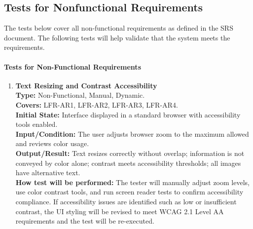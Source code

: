 \documentclass[12pt, titlepage]{article}
\begin{document}
\subsection{Tests for Nonfunctional Requirements}

The tests below cover all non-functional requirements as defined in
the SRS document. The following tests will help validate that the system meets 
the requirements. 

\paragraph{Tests for Non-Functional Requirements}

\begin{enumerate}[label=NFR-ST \arabic*., wide=0pt, leftmargin=*]

  \item{}
    \textbf{Text Resizing and Contrast Accessibility} \\[2mm]
    \textbf{Type:} Non-Functional, Manual, Dynamic. \\
    \textbf{Covers:} LFR-AR1, LFR-AR2, LFR-AR3, LFR-AR4. \\
    \textbf{Initial State:} Interface displayed in a standard browser
    with accessibility tools enabled. \\
    \textbf{Input/Condition:} The user adjusts browser zoom to the
    maximum allowed and reviews color usage. \\
    \textbf{Output/Result:} Text resizes correctly without overlap;
    information is not conveyed by color alone; contrast meets
    accessibility thresholds; all images have alternative text. \\[2mm]
    \textbf{How test will be performed:} The tester will manually
    adjust zoom levels, use color contrast tools, and run screen
    reader tests to confirm accessibility compliance. If accessibility issues are identified 
    such as low or insufficient contrast, the UI styling will be revised to meet WCAG 2.1 Level 
    AA requirements and the test will be re-executed.


\end{enumerate}
\end{document}
